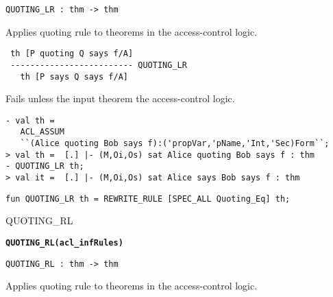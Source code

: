 \begin{verbatim}
QUOTING_LR : thm -> thm
\end{verbatim}

\SYNOPSIS
Applies quoting rule to theorems in the access-control logic.

\DESCRIBE
\begin{verbatim}
 th [P quoting Q says f/A]
 ------------------------- QUOTING_LR
   th [P says Q says f/A]
\end{verbatim}

\FAILURE
Fails unless the input theorem 
the access-control logic.

\EXAMPLE
\begin{holboxed}
\begin{verbatim}
- val th = 
   ACL_ASSUM 
   ``(Alice quoting Bob says f):('propVar,'pName,'Int,'Sec)Form``;
> val th =  [.] |- (M,Oi,Os) sat Alice quoting Bob says f : thm
- QUOTING_LR th;
> val it =  [.] |- (M,Oi,Os) sat Alice says Bob says f : thm
\end{verbatim}
\end{holboxed}

\IMPLEMENTATION
\begin{holboxed}
\begin{verbatim}
fun QUOTING_LR th = REWRITE_RULE [SPEC_ALL Quoting_Eq] th;
\end{verbatim}
\end{holboxed}


\SEEALSO
QUOTING\_RL
\ENDDOC

\begin{holboxed}
  \begin{Large}
    \textbf{\texttt{QUOTING\_RL}}\hfill{}\textbf{\texttt{(acl\_infRules)}}
  \end{Large}
\end{holboxed}

\begin{verbatim}
QUOTING_RL : thm -> thm
\end{verbatim}

\SYNOPSIS
Applies quoting rule to theorems in the access-control logic.


